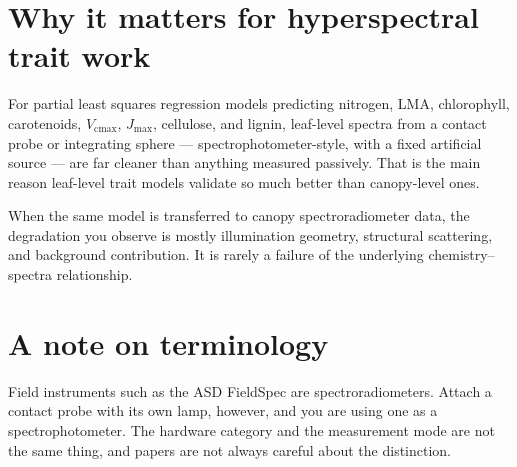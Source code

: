\documentclass[11pt,letterpaper]{article}
\newcommand{\Vcmax}{\ensuremath{V_{\mathrm{cmax}}}}
\newcommand{\Jmax}{\ensuremath{J_{\mathrm{max}}}}
\begin{document}
\section{Why it matters for hyperspectral trait work}

For partial least squares regression models predicting nitrogen, LMA, chlorophyll, carotenoids,
\Vcmax, \Jmax, cellulose, and lignin, leaf-level spectra from a contact probe or integrating sphere
--- spectrophotometer-style, with a fixed artificial source --- are far cleaner than anything
measured passively. That is the main reason leaf-level trait models validate so much better than
canopy-level ones.

When the same model is transferred to canopy spectroradiometer data, the degradation you observe is
mostly illumination geometry, structural scattering, and background contribution. It is rarely a
failure of the underlying chemistry--spectra relationship.

\section{A note on terminology}

Field instruments such as the ASD FieldSpec are spectroradiometers. Attach a contact probe with its
own lamp, however, and you are using one as a spectrophotometer. The hardware category and the
measurement mode are not the same thing, and papers are not always careful about the distinction.
\end{document}
